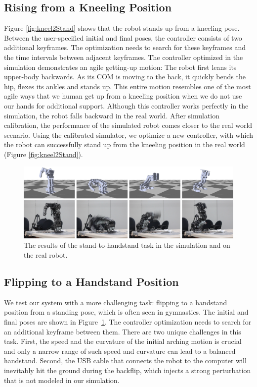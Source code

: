 \subsection{Rising from a Kneeling Position}

Figure \ref{fig:kneel2Stand} shows that the robot stands up from a kneeling pose. Between the user-specified initial and final poses, the controller consists of two additional keyframes. The optimization needs to search for these keyframes and the time intervals between adjacent keyframes. The controller optimized in the simulation demonstrates an agile getting-up motion: The robot first leans its upper-body backwards. As its COM is moving to the back, it quickly bends the hip, flexes its ankles and stands up. This entire motion resembles one of the most agile ways that we human get up from a kneeling position when we do not use our hands for additional support. Although this controller works perfectly in the simulation, the robot falls backward in the real world. After simulation calibration, the performance of the simulated robot comes closer to the real world scenario. Using the calibrated simulator, we optimize a new controller, with which the robot can successfully stand up from the kneeling position in the real world (Figure \ref{fig:kneel2Stand}).

\begin{figure}[!t]
  \centering
  \includegraphics[width=\textwidth]{figures/stand2Hand}
  \caption{The results of the stand-to-handstand task in the simulation and on the real robot.}
  \label{fig:stand2Hand}
\end{figure}


\subsection{Flipping to a Handstand Position}
We test our system with a more challenging task: flipping to a handstand position from a standing pose, which is often seen in gymnastics. The initial and final poses are shown in Figure~\ref{fig:stand2Hand}. The controller optimization needs to search for an additional keyframe between them. There are two unique challenges in this task. First, the speed and the curvature of the initial arching motion is crucial and only a narrow range of such speed and curvature can lead to a balanced handstand. Second, the USB cable that connects the robot to the computer will inevitably hit the ground during the backflip, which injects a strong perturbation that is not modeled in our simulation.

